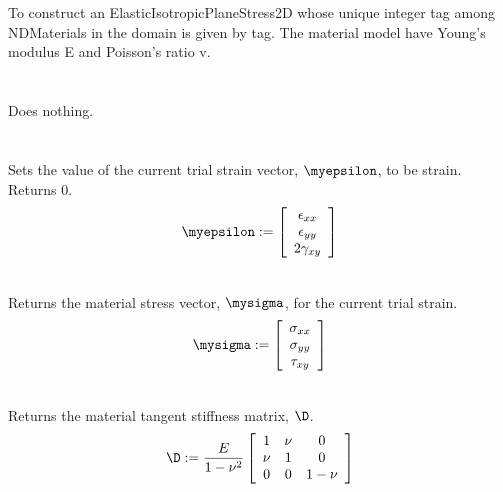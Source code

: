   \\
  \\
To construct an ElasticIsotropicPlaneStress2D whose unique integer tag
among NDMaterials in the domain is given by \p tag.  The material
model have Young's modulus \p E and Poisson's ratio \p v. \\

 \\
 \\
Does nothing. \\ 

 \\
  \\
Sets the value of the current trial strain vector, $\myepsilon$,
to be \p strain. Returns $0$. \\

\begin{displaymath}
\myepsilon := \left[
   \begin{array}{c}
       \epsilon_{xx} \\
       \epsilon_{yy}   \\
       2 \gamma_{xy}   
   \end{array} 
 \right]
\end{displaymath}

 \\
Returns the material stress vector, $\mysigma$, for the current
trial strain. \\

\begin{displaymath}
\mysigma := \left[
   \begin{array}{c}
       \sigma_{xx} \\
       \sigma_{yy}   \\
       \tau_{xy}   
   \end{array} 
 \right]
\end{displaymath}

 \\
Returns the material tangent stiffness matrix, $\D$. \\

\begin{displaymath}
\D := \frac{E}{1-\nu^2} \left[
   \begin{array}{ccc}
         1 & \nu &     0 \\
       \nu &   1 &     0 \\
         0 &   0 & 1-\nu
   \end{array} 
 \right]
\end{displaymath}


